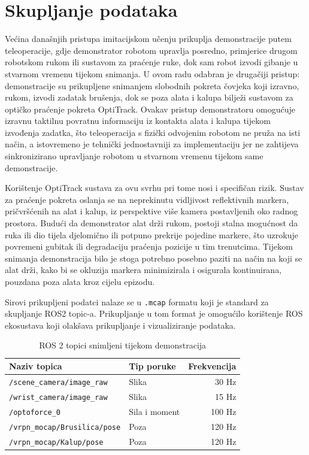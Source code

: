 \documentclass[times, utf8, diplomski]{fer}
\begin{document}
\section{Skupljanje podataka}

Većina današnjih pristupa imitacijskom učenju prikuplja demonstracije putem teleoperacije, gdje demonstrator robotom upravlja posredno, primjerice drugom robotskom rukom ili sustavom za praćenje ruke, dok sam robot izvodi gibanje u stvarnom vremenu tijekom snimanja. U ovom radu odabran je drugačiji pristup: demonstracije su prikupljene snimanjem slobodnih pokreta čovjeka koji izravno, rukom, izvodi zadatak brušenja, dok se poza alata i kalupa bilježi sustavom za optičko praćenje pokreta OptiTrack. Ovakav pristup demonstratoru omogućuje izravnu taktilnu povratnu informaciju iz kontakta alata i kalupa tijekom izvođenja zadatka, što teleoperacija s fizički odvojenim robotom ne pruža na isti način, a istovremeno je tehnički jednostavniji za implementaciju jer ne zahtijeva sinkronizirano upravljanje robotom u stvarnom vremenu tijekom same demonstracije.
 
Korištenje OptiTrack sustava za ovu svrhu pri tome nosi i specifičan rizik. Sustav za praćenje pokreta oslanja se na neprekinutu vidljivost reflektivnih markera, pričvršćenih na alat i kalup, iz perspektive više kamera postavljenih oko radnog prostora. Budući da demonstrator alat drži rukom, postoji stalna mogućnost da ruka ili dio tijela djelomično ili potpuno prekrije pojedine markere, što uzrokuje povremeni gubitak ili degradaciju praćenja pozicije u tim trenutcima. Tijekom snimanja demonstracija bilo je stoga potrebno posebno paziti na način na koji se alat drži, kako bi se okluzija markera minimizirala i osigurala kontinuirana, pouzdana poza alata kroz cijelu epizodu.

Sirovi prikupljeni podatci nalaze se u \texttt{.mcap} formatu koji je standard za skupljanje ROS2 topic-a. Prikupljanje u tom format je omogućilo korištenje ROS ekosustava koji olakšava prikupljanje i vizualiziranje podataka. 

\begin{table}[h]
    \centering
    \caption{ROS 2 topici snimljeni tijekom demonstracija}
    \label{tab:ros_topics}
    \begin{tabular}{llr}
        \toprule
        \textbf{Naziv topica} & \textbf{Tip poruke} & \textbf{Frekvencija} \\
        \midrule
        \texttt{/scene\_camera/image\_raw}                & Slika                & 30 Hz  \\
        \texttt{/wrist\_camera/image\_raw}                & Slika                & 15 Hz  \\
        \texttt{/optoforce\_0}                    & Sila i moment        & 100 Hz  \\
        \texttt{/vrpn\_mocap/Brusilica/pose}      & Poza                 & 120 Hz \\
        \texttt{/vrpn\_mocap/Kalup/pose}          & Poza                 & 120 Hz \\
        \bottomrule
    \end{tabular}
\end{table}
\end{document}

